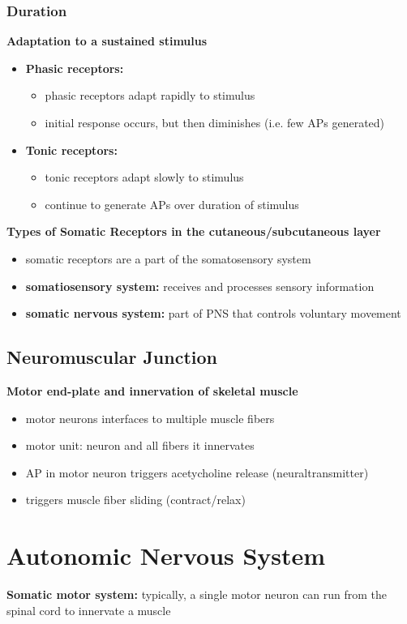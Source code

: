 \documentclass[11pt,fleqn]{book} %
\begin{document}
\subsubsection{Duration}
\textbf{Adaptation to a sustained stimulus}
\begin{itemize}
    \item \textbf{Phasic receptors:} 
    \begin{itemize}
        \item phasic receptors adapt rapidly to stimulus
        \item initial response occurs, but then diminishes (i.e. few APs generated)
    \end{itemize}
    \item \textbf{Tonic receptors:}
    \begin{itemize}
        \item tonic receptors adapt slowly to stimulus
        \item continue to generate APs over duration of stimulus
    \end{itemize}
\end{itemize}

\textbf{Types of Somatic Receptors in the cutaneous/subcutaneous layer}
\begin{itemize}
    \item somatic receptors are a part of the somatosensory system
    \item \textbf{somatiosensory system:} receives and processes sensory information
    \item \textbf{somatic nervous system:} part of PNS that controls voluntary movement
\end{itemize}

\subsection{Neuromuscular Junction}
\textbf{Motor end-plate and innervation of skeletal muscle}
\begin{itemize}
    \item motor neurons interfaces to multiple muscle fibers
    \item motor unit: neuron and all fibers it innervates
    \item AP in motor neuron triggers acetycholine release (neuraltransmitter)
    \item triggers muscle fiber sliding (contract/relax)
\end{itemize}

\section{Autonomic Nervous System}
\textbf{Somatic motor system:} typically, a single motor neuron can run from the spinal cord to innervate a muscle
\end{document}
